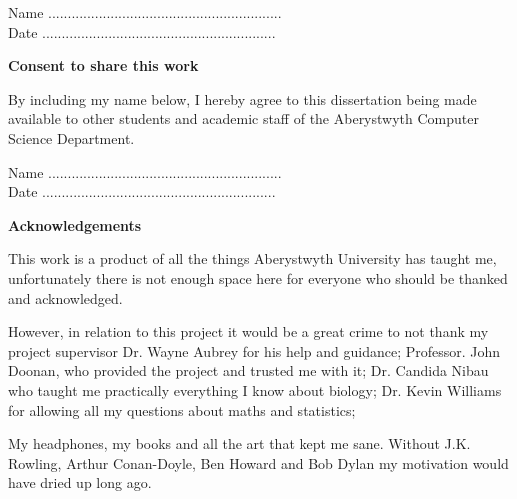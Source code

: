 \documentclass[11pt]{report}
\begin{document}
  \vspace{2em}
  Name ............................................................  \\

  \vspace{1em}
  Date ............................................................ \\

  \vspace{1em}
  \begin{center}
    {\LARGE\bf Consent to share this work}
  \end{center}

  By including my name below, I hereby agree to this dissertation being made available to other students and academic staff of the Aberystwyth Computer Science Department.

  \vspace{2em}
  Name ............................................................  \\

  \vspace{1em}
  Date ............................................................ \\

  \clearpage

  \thispagestyle{plain}

  \begin{center}
    {\LARGE\bf Acknowledgements}
  \end{center}

\vspace{3cm}

This work is a product of all the things Aberystwyth University has taught me, unfortunately
there is not enough space here for everyone who should be thanked and acknowledged.

\vspace{1cm}

However, in relation to this project it would be a great crime to not thank my project supervisor Dr. Wayne Aubrey for his help and guidance;
Professor. John Doonan, who provided the project and trusted me with it;
Dr. Candida Nibau who taught me practically everything I know about biology; Dr. Kevin Williams for allowing all my questions about maths and statistics;

\vspace{1cm}

My headphones, my books and all the art that kept me sane. Without J.K. Rowling, Arthur Conan-Doyle, Ben Howard and Bob Dylan
 my motivation would have dried up long ago.
\end{document}
